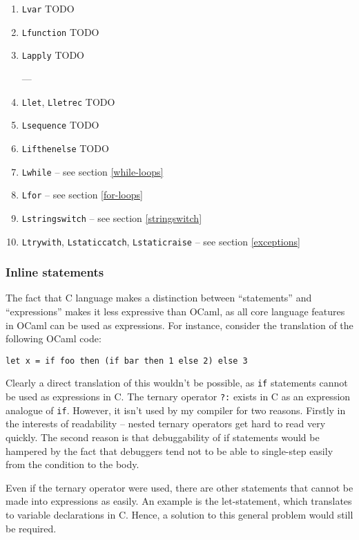 \documentclass[12pt,a4paper,twoside,openright]{report}
\begin{document}
\begin{enumerate}
  \item \lstinline!Lvar! TODO
  \item \lstinline!Lfunction! TODO
  \item \lstinline!Lapply! TODO

    ---

  \item \lstinline!Llet!, \lstinline!Lletrec! TODO
  \item \lstinline!Lsequence! TODO
  \item \lstinline!Lifthenelse! TODO
  \item \lstinline!Lwhile! -- see section \ref{while-loops}
  \item \lstinline!Lfor! -- see section \ref{for-loops}
  \item \lstinline!Lstringswitch! -- see section \ref{stringswitch}
  \item \lstinline!Ltrywith!, \lstinline!Lstaticcatch!, \lstinline!Lstaticraise! -- see section \ref{exceptions}
\end{enumerate}

\subsubsection{Inline statements}\label{c-inline-statements}

The fact that C language makes a distinction between ``statements'' and
``expressions'' makes it less expressive than OCaml, as all core language
features in OCaml can be used as expressions. For instance, consider the
translation of the following OCaml code:

\begin{lstlisting}
let x = if foo then (if bar then 1 else 2) else 3
\end{lstlisting}

Clearly a direct translation of this wouldn't be possible, as \lstinline!if!
statements cannot be used as expressions in C. The ternary operator
\lstinline!?:! exists in C as an expression analogue of \lstinline!if!.
However, it isn't used by my compiler for two reasons.  Firstly in the
interests of readability -- nested ternary operators get hard to read very
quickly. The second reason is that debuggability of if statements would be
hampered by the fact that debuggers tend not to be able to single-step easily
from the condition to the body.

Even if the ternary operator were used, there are other statements that
cannot be made into expressions as easily. An example is the let-statement,
which translates to variable declarations in C. Hence, a solution to this
general problem would still be required.
\end{document}
